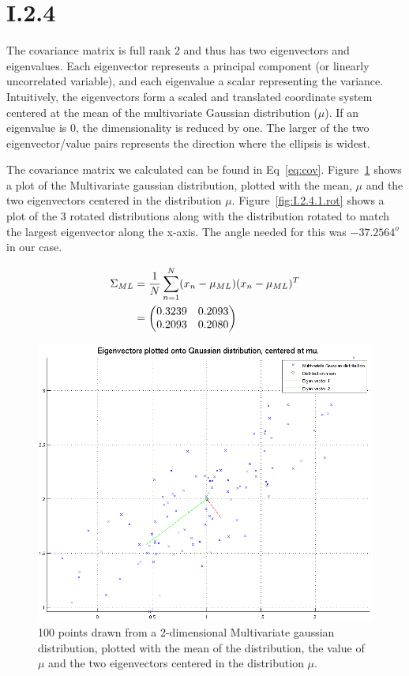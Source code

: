 \FloatBarrier
\section*{I.2.4}
The covariance matrix is full rank 2 and thus has two eigenvectors and
eigenvalues. Each eigenvector represents a principal component (or linearly
uncorrelated variable), and each eigenvalue a scalar representing the variance.
Intuitively, the eigenvectors form a scaled and translated coordinate system
centered at the mean of the multivariate Gaussian distribution ($\mu$). If an
eigenvalue is 0, the dimensionality is reduced by one. The larger of the two
eigenvector/value pairs represents the direction where the ellipsis is widest.

The covariance matrix we calculated can be found in
Eq~\ref{eq:cov}. Figure~\ref{fig:I.2.4.1} shows a plot of the Multivariate
gaussian distribution, plotted with the mean, $\mu$ and the two eigenvectors
centered in the distribution $\mu$. Figure~\ref{fig:I.2.4.1.rot} shows a plot of
the 3 rotated distributions along with the distribution rotated to match the
largest eigenvector along the x-axis. The angle needed for this was $-37.2564^o$
in our case.

\begin{align}
	\Sigma_{ML} &= \frac{1}{N} \sum_{n=1}^N (x_n - \mu_{ML}) (x_n - \mu_{ML})^T \notag \\
	&= \begin{pmatrix}
		0.3239 & 0.2093 \\
		0.2093 & 0.2080
	\end{pmatrix} \label{eq:cov}
\end{align}

\begin{figure}[h!]
	\includegraphics[width=\textwidth]{img/multigausseigen}
	\caption{100 points drawn from a 2-dimensional Multivariate gaussian
          distribution, plotted with the mean of the distribution, the value of
          $\mu$ and the two eigenvectors centered in the distribution
          $\mu$. \label{fig:I.2.4.1}}
\end{figure}

